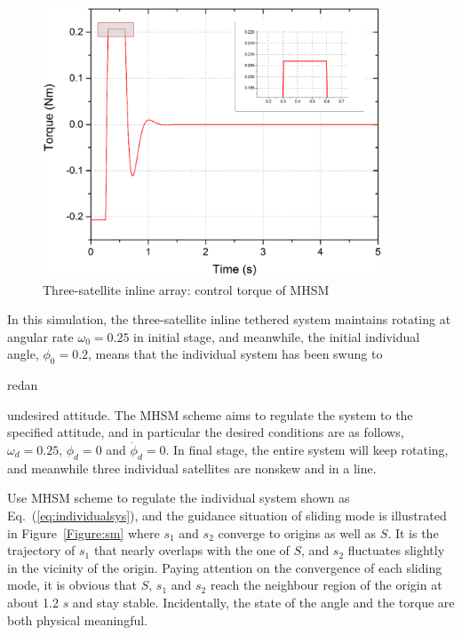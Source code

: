 \begin{figure}
\centering
\includegraphics[width=0.9\textwidth]{paper2_Fig7.eps}
\caption{Three-satellite inline array: control torque of MHSM}
\label{Figure:Torque}
\end{figure}
In this simulation, the three-satellite inline tethered system maintains rotating at angular rate $\omega_0=0.25$ in initial stage, and meanwhile, the initial individual angle, $\phi_0 = 0.2$, means that the individual system has been swung to \begin{color}{red}an\end{color} undesired attitude. The MHSM scheme aims to regulate the system to the specified attitude, and in particular the desired conditions are as follows, $\omega_d = 0.25$, $\phi_d = 0$ and $\dot{\phi}_d = 0$. In final stage, the entire system will keep rotating, and meanwhile three individual satellites are nonskew and in a line.\par
Use MHSM scheme to regulate the individual system shown as Eq.~(\ref{eq:individualsys}), and the guidance situation of sliding mode is illustrated in Figure~\ref{Figure:sm} where $s_1$ and $s_2$ converge to origins as well as $S$. It is the trajectory of $s_1$ that nearly overlaps with the one of $S$, and $s_2$ fluctuates slightly in the vicinity of the origin. Paying attention on the convergence of each sliding mode, it is obvious that $S$, $s_1$ and $s_2$ reach the neighbour region of the origin at about 1.2 $s$ and stay stable. Incidentally, the state of the angle and the torque are both physical meaningful.\par
